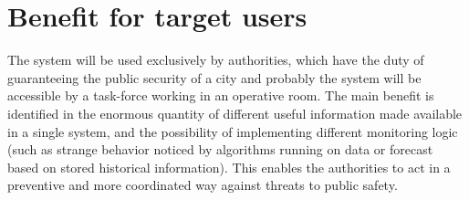 \documentclass[../main.tex]{subfiles}
\begin{document}
    \section{Benefit for target users}\label{sec:benefit-for-target-users}
    The system will be used exclusively by authorities, which have the duty of guaranteeing the public security of a city and probably the system will be accessible by a task-force working in an operative room.
    The main benefit is identified in the enormous quantity of different useful information made available in a single system, and the possibility of implementing different monitoring logic (such as strange behavior noticed by algorithms running on data or forecast based on stored  historical information). This enables the authorities to act in a preventive and more coordinated way against threats to public safety.
\end{document}
